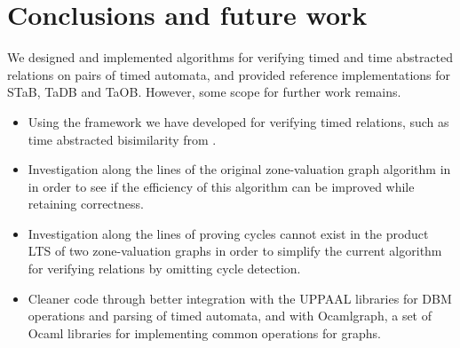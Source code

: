 \chapter{Conclusions and future work}

We designed and implemented algorithms for verifying timed and time abstracted
relations on pairs of timed automata, and provided reference
implementations for STaB, TaDB and TaOB. However, some scope for
further work remains.

\begin{itemize}
\item Using the framework we have developed for verifying timed
  relations, such as time abstracted bisimilarity from
  \cite{DBLP:conf/cav/GuhaNA12}.
\item Investigation along the lines of the original zone-valuation
  graph algorithm in \cite{DBLP:conf/cav/GuhaNA12} in order to see if the
  efficiency of this algorithm can be improved while retaining
  correctness.
\item Investigation along the lines of proving cycles cannot exist in
  the product LTS of two zone-valuation graphs in order to simplify
  the current algorithm for verifying relations by omitting cycle detection.
\item Cleaner code through better integration with the UPPAAL
  libraries for DBM operations and parsing of timed automata, and with
  Ocamlgraph, a set of Ocaml libraries for implementing common
  operations for graphs.
\end{itemize}
